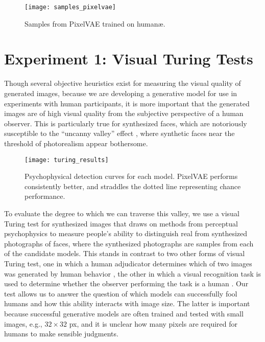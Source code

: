 \documentclass[10pt,letterpaper]{article}
\begin{document}
\begin{figure*}[!h]
  \begin{center}
    \texttt{[image: samples\_pixelvae]}
  \vspace{-6mm}
  \caption{Samples from PixelVAE trained on human\ae.}
  \label{samples_pixelvae}
  \end{center}
  \vspace{-5mm}
\end{figure*}

\section{Experiment 1: Visual Turing Tests}

Though several objective heuristics exist for measuring the visual quality of generated images, because we are developing a generative model for use in experiments with human participants, it is more important that the generated images are of high visual quality from the subjective perspective of a human observer. This is particularly true for synthesized faces, which are notoriously susceptible to the ``uncanny valley'' effect \citep{mori1970uncanny}, where synthetic faces near the threshold of photorealism appear bothersome.

\begin{figure}[!h]
  \begin{center}
    \texttt{[image: turing\_results]}
  \vspace{-6mm}
  \caption{Psychophysical detection curves for each model. PixelVAE performs consistently better, and straddles the dotted line representing chance performance.}
  \label{turing_results}
  \end{center}
  \vspace{-5mm}
\end{figure}

To evaluate the degree to which we can traverse this valley, we use a visual Turing test for synthesized images that draws on methods from perceptual psychophysics to measure people's ability to distinguish real from synthesized photographs of faces, where the synthesized photographs are samples from each of the candidate models. This stands in contrast to two other forms of visual Turing test, one in which a human adjudicator determines which of two images was generated by human behavior \citep{lake2015human}, the other in which a visual recognition task is used to determine whether the observer performing the task is a human \citep{von2003captcha, geman2015visual}. Our test allows us to answer the question of which models can successfully fool humans and how this ability interacts with image size. The latter is important because successful generative models are often trained and tested with small images, e.g., $32\times32$ px, and it is unclear how many pixels are required for humans to make sensible judgments.
\end{document}
